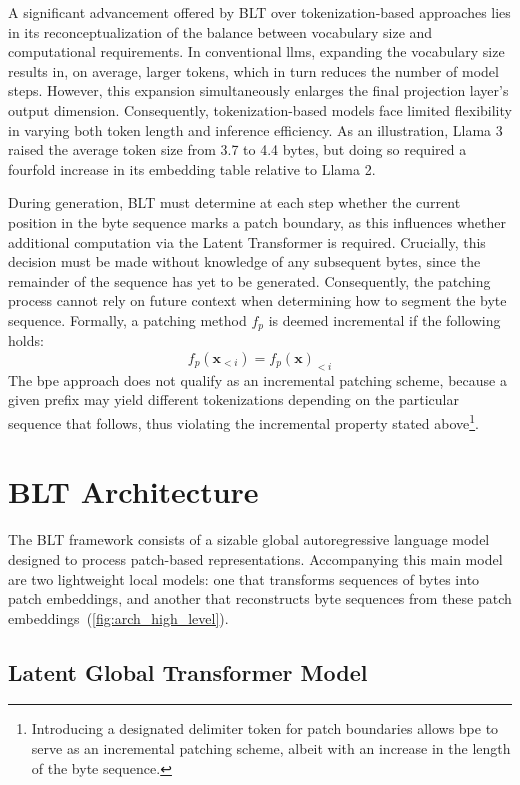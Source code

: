 A significant advancement offered by {\textsc BLT} over tokenization-based approaches lies in its reconceptualization of the balance between vocabulary size and computational requirements. In conventional llms, expanding the vocabulary size results in, on average, larger tokens, which in turn reduces the number of model steps. However, this expansion simultaneously enlarges the final projection layer’s output dimension. Consequently, tokenization-based models face limited flexibility in varying both token length and inference efficiency. As an illustration, Llama 3 raised the average token size from 3.7 to 4.4 bytes, but doing so required a fourfold increase in its embedding table relative to Llama 2.

During generation, {\textsc BLT} must determine at each step whether the current position in the byte sequence marks a patch boundary, as this influences whether additional computation via the Latent Transformer is required. Crucially, this decision must be made without knowledge of any subsequent bytes, since the remainder of the sequence has yet to be generated. Consequently, the patching process cannot rely on future context when determining how to segment the byte sequence. Formally, a patching method $f_p$ is deemed incremental if the following holds:
$$f_p(\pmb{x}_{<i}) = f_p(\pmb{x})_{<i}$$
The bpe approach does not qualify as an incremental patching scheme, because a given prefix may yield different tokenizations depending on the particular sequence that follows, thus violating the incremental property stated above\footnote{Introducing a designated delimiter token for patch boundaries allows bpe to serve as an incremental patching scheme, albeit with an increase in the length of the byte sequence.}.

\section{{\textsc BLT} Architecture}
\label{section:architecture}
The {\textsc BLT} framework consists of a sizable global autoregressive language model designed to process patch-based representations. Accompanying this main model are two lightweight local models: one that transforms sequences of bytes into patch embeddings, and another that reconstructs byte sequences from these patch embeddings~(\autoref{fig:arch_high_level}).

\subsection{Latent Global Transformer Model}

